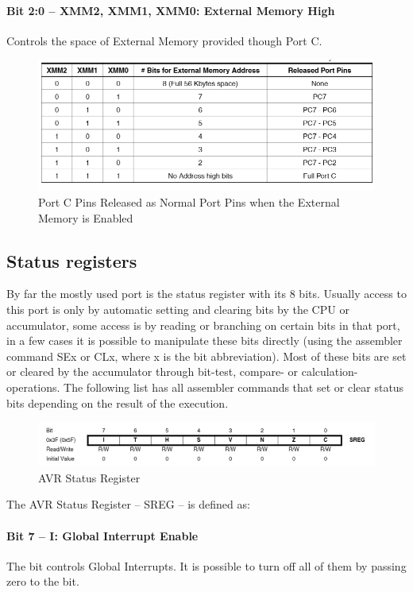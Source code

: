\documentclass[english]{article}
\begin{document}
\paragraph{Bit 2:0 – XMM2, XMM1, XMM0: External Memory High} Controls the space of External Memory provided though Port C.
\begin{figure}[h]
\caption{Port C Pins Released as Normal Port Pins when the External Memory is Enabled}
\centerline{\includegraphics[scale=0.8]{MicroLab1/39p}}
\end{figure}

\subsection{Status registers}
By far the mostly used port is the status register with its 8 bits. Usually access to this port is only by automatic setting and clearing bits by the CPU or accumulator, some access is by reading or branching on certain bits in that port, in a few cases it is possible to manipulate these bits directly (using the assembler command SEx or CLx, where x is the bit abbreviation). Most of these bits are set or cleared by the accumulator through bit-test, compare- or calculation-operations. The following list has all assembler commands that set or clear status bits depending on the result of the execution. 
\begin{figure}[H]
\centerline{\includegraphics[scale=0.8]{MicroLab1/14p}}
\caption{AVR Status Register}
\end{figure}
The AVR Status Register – SREG – is defined as:

\paragraph{Bit 7 – I: Global Interrupt Enable} The bit controls Global Interrupts. It is possible to turn off all of them by passing zero to the bit.
\end{document}
